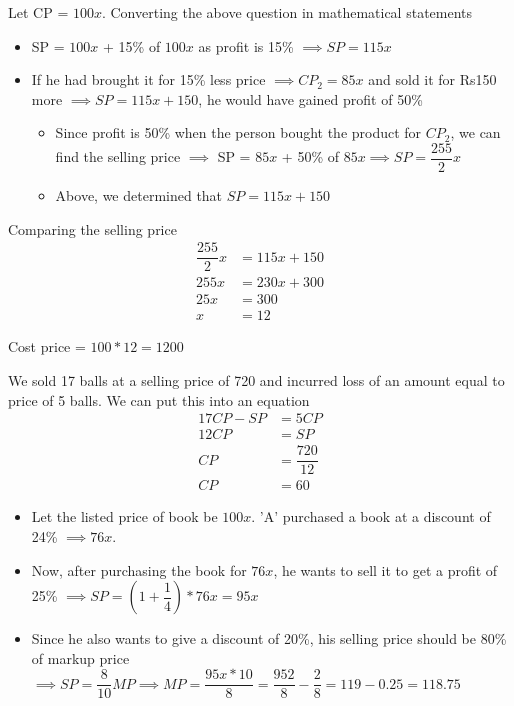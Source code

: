 Let CP = $100x$. Converting the above question in mathematical statements
\begin{itemize}
    \item SP = $100x$ + 15\% of $100x$ as profit is 15\% $\implies SP = 115x$
    
    \item If he had brought it for 15\% less price $\implies CP_2 = 85x$ and sold it for Rs150 more $\implies SP = 115x + 150$, he would have gained profit of 50\%
    \begin{itemize}
        \item Since profit is 50\% when the person bought the product for $CP_2$, we can find the selling price $\implies$ SP = $85x$ + 50\% of $85x \implies SP = \dfrac{255}{2}x$
        \item Above, we determined that $SP = 115x + 150$
    \end{itemize}
\end{itemize}

Comparing the selling price
\begin{align*}
    \dfrac{255}{2}x &= 115x + 150 \\
    255x &= 230x + 300 \\
    25x &= 300 \\
    x &= 12
\end{align*}

Cost price = $100 * 12 = 1200$


We sold 17 balls at a selling price of 720 and incurred loss of an amount equal to price of 5 balls. We can put this into an equation
\begin{align*}
    17CP - SP &= 5CP \tag{Cost price of 17 balls = 17CP, selling price = SP} \\
    12CP &= SP \\
    CP &= \dfrac{720}{12} \\
    CP &= 60
\end{align*}



\begin{itemize}
    \item Let the listed price of book be $100x$. 'A' purchased a book at a discount of 24\% $\implies 76x$. 
    \item Now, after purchasing the book for $76x$, he wants to sell it to get a profit of 25\% $\implies SP = (1 + \dfrac{1}{4}) * 76x = 95x$
    \item Since he also wants to give a discount of 20\%, his selling price should be 80\% of markup price $\implies SP = \dfrac{8}{10} MP \implies MP = \dfrac{95x * 10}{8} = \dfrac{952}{8} - \dfrac{2}{8} = 119 - 0.25 = 118.75$
\end{itemize}

